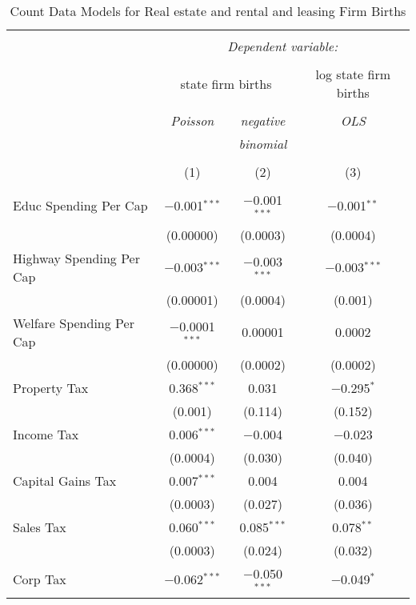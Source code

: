 
\begin{table}[!htbp] \centering 
  \caption{Count Data Models for Real estate and rental and leasing Firm Births} 
  \label{} 
\begin{tabular}{@{\extracolsep{5pt}}lccc} 
\\[-1.8ex]\hline 
\hline \\[-1.8ex] 
 & \multicolumn{3}{c}{\textit{Dependent variable:}} \\ 
\cline{2-4} 
\\[-1.8ex] & \multicolumn{2}{c}{state firm births} & log state firm births \\ 
\\[-1.8ex] & \textit{Poisson} & \textit{negative} & \textit{OLS} \\ 
 & \textit{} & \textit{binomial} & \textit{} \\ 
\\[-1.8ex] & (1) & (2) & (3)\\ 
\hline \\[-1.8ex] 
 Educ Spending Per Cap & $-$0.001$^{***}$ & $-$0.001$^{***}$ & $-$0.001$^{**}$ \\ 
  & (0.00000) & (0.0003) & (0.0004) \\ 
  Highway Spending Per Cap  & $-$0.003$^{***}$ & $-$0.003$^{***}$ & $-$0.003$^{***}$ \\ 
  & (0.00001) & (0.0004) & (0.001) \\ 
  Welfare Spending Per Cap  & $-$0.0001$^{***}$ & 0.00001 & 0.0002 \\ 
  & (0.00000) & (0.0002) & (0.0002) \\ 
  Property Tax & 0.368$^{***}$ & 0.031 & $-$0.295$^{*}$ \\ 
  & (0.001) & (0.114) & (0.152) \\ 
  Income Tax & 0.006$^{***}$ & $-$0.004 & $-$0.023 \\ 
  & (0.0004) & (0.030) & (0.040) \\ 
  Capital Gains Tax & 0.007$^{***}$ & 0.004 & 0.004 \\ 
  & (0.0003) & (0.027) & (0.036) \\ 
  Sales Tax & 0.060$^{***}$ & 0.085$^{***}$ & 0.078$^{**}$ \\ 
  & (0.0003) & (0.024) & (0.032) \\ 
  Corp Tax & $-$0.062$^{***}$ & $-$0.050$^{***}$ & $-$0.049$^{*}$ \\ 

\end{tabular}
\end{table}
